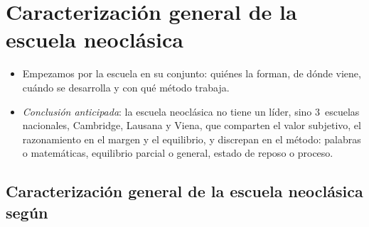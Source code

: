 \documentclass[11pt]{article}
\begin{document}
\section{Caracterización general de la escuela neoclásica}\label{sec:caracterizacion}

\begin{itemize}
\item Empezamos por la escuela en su conjunto: quiénes la forman, de dónde viene, cuándo se desarrolla y con qué método trabaja.
\item \emph{Conclusión anticipada}: la escuela neoclásica no tiene un líder, sino 3~escuelas nacionales, Cambridge, Lausana y Viena, que comparten el valor subjetivo, el razonamiento en el margen y el equilibrio, y discrepan en el método: palabras o matemáticas, equilibrio parcial o general, estado de reposo o proceso.
\end{itemize}

\subsection{Caracterización general de la escuela neoclásica según }\label{sec:schumpeter}
\end{document}
